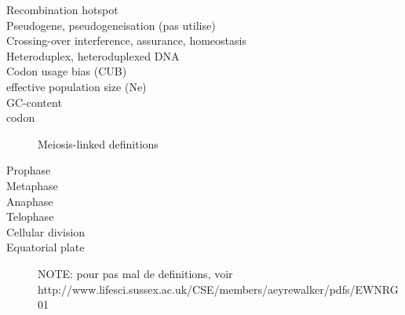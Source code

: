 \begin{alwayssingle}
\begin{description}
		\item[Recombination hotspot]
		\item[Pseudogene, pseudogeneisation (pas utilise)]
		\item[Crossing-over interference, assurance, homeostasis]
		\item[Heteroduplex, heteroduplexed DNA]
		\item[Codon usage bias (CUB)]
		\item[effective population size (Ne)]
\item[GC-content]
\item[codon]



Meiosis-linked definitions
\item[Prophase]
\item[Metaphase]
\item[Anaphase]
\item[Telophase]
\item[Cellular division]
\item[Equatorial plate]


NOTE\@: pour pas mal de definitions, voir http://www.lifesci.sussex.ac.uk/CSE/members/aeyrewalker/pdfs/EWNRG01%


	\end{description}
\end{alwayssingle}
\mtcaddchapter{}


